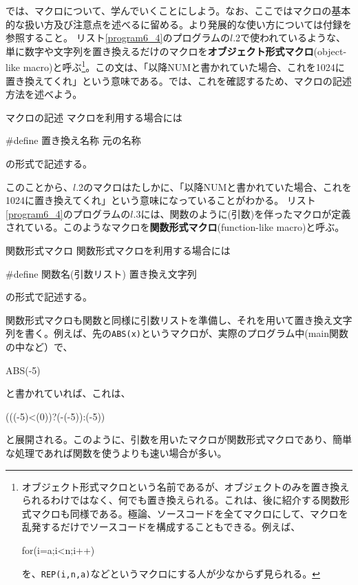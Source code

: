 では、マクロについて、学んでいくことにしよう。なお、ここではマクロの基本的な扱い方及び注意点を述べるに留める。より発展的な使い方については付録を参照すること。
リスト\ref{program6_4}のプログラムの$l$.2で使われているような、単に数字や文字列を置き換えるだけのマクロを\textbf{オブジェクト形式マクロ}(object-like macro)と呼ぶ\footnote{オブジェクト形式マクロという名前であるが、オブジェクトのみを置き換えられるわけではなく、何でも置き換えられる。これは、後に紹介する関数形式マクロも同様である。極論、ソースコードを全てマクロにして、マクロを乱発するだけでソースコードを構成することもできる。例えば、
\begin{code}
for(i=a;i<n;i++)
\end{code}
を、\verb|REP(i,n,a)|などというマクロにする人が少なからず見られる。}。この文は、「以降NUMと書かれていた場合、これを1024に置き換えてくれ」という意味である。では、これを確認するため、マクロの記述方法を述べよう。
\begin{itembox}[l]{マクロの記述}
マクロを利用する場合には
\begin{code}
#define 置き換え名称 元の名称
\end{code}
の形式で記述する。
\end{itembox}

このことから、$l$.2のマクロはたしかに、「以降NUMと書かれていた場合、これを1024に置き換えてくれ」という意味になっていることがわかる。
リスト\ref{program6_4}のプログラムの$l$.3には、関数のように(引数)を伴ったマクロが定義されている。このようなマクロを\textbf{関数形式マクロ}(function-like macro)と呼ぶ。
\begin{itembox}[l]{関数形式マクロ}
関数形式マクロを利用する場合には
\begin{code}
#define 関数名(引数リスト) 置き換え文字列
\end{code}
の形式で記述する。
\end{itembox}

関数形式マクロも関数と同様に引数リストを準備し、それを用いて置き換え文字列を書く。例えば、先の\verb|ABS(x)|というマクロが、実際のプログラム中(main関数の中など）で、
\begin{code}
ABS(-5)
\end{code}
と書かれていれば、これは、
\begin{code}
(((-5)<(0))?(-(-5)):(-5))
\end{code}
と展開される。このように、引数を用いたマクロが関数形式マクロであり、簡単な処理であれば関数を使うよりも速い場合が多い。

